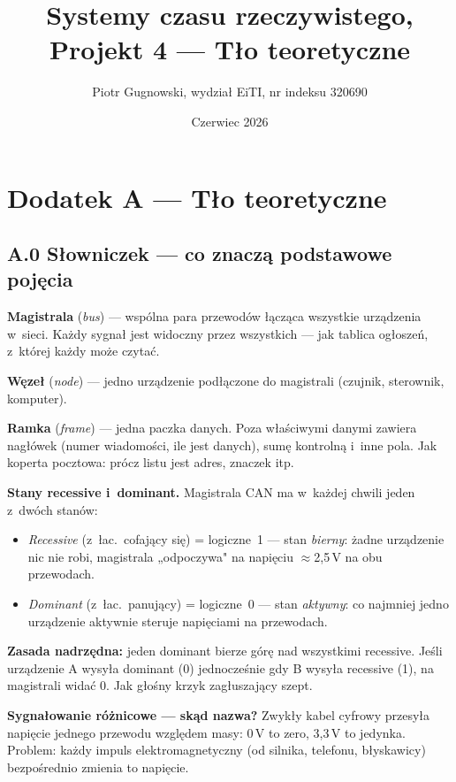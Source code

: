 \documentclass[12pt,a4paper]{article}
\title{Systemy czasu rzeczywistego, Projekt 4 — Tło teoretyczne}
\author{Piotr Gugnowski, wydział EiTI, nr indeksu 320690}
\date{Czerwiec 2026}
\begin{document}
\maketitle

\section*{Dodatek A — Tło teoretyczne}

\subsection*{A.0 Słowniczek — co znaczą podstawowe pojęcia}

\textbf{Magistrala} (\textit{bus}) — wspólna para przewodów łącząca wszystkie
urządzenia w~sieci. Każdy sygnał jest widoczny przez wszystkich — jak tablica
ogłoszeń, z~której każdy może czytać.

\medskip
\textbf{Węzeł} (\textit{node}) — jedno urządzenie podłączone do magistrali
(czujnik, sterownik, komputer).

\medskip
\textbf{Ramka} (\textit{frame}) — jedna paczka danych. Poza właściwymi danymi
zawiera nagłówek (numer wiadomości, ile jest danych), sumę kontrolną i~inne pola.
Jak koperta pocztowa: prócz listu jest adres, znaczek itp.

\medskip
\textbf{Stany recessive i~dominant.}
Magistrala CAN ma w~każdej chwili jeden z~dwóch stanów:
\begin{itemize}
    \item \textit{Recessive} (z~łac.\ cofający się) = logiczne~1 — stan
          \emph{bierny}: żadne urządzenie nic nie robi, magistrala
          „odpoczywa" na napięciu $\approx$2,5\,V na obu przewodach.
    \item \textit{Dominant} (z~łac.\ panujący) = logiczne~0 — stan
          \emph{aktywny}: co najmniej jedno urządzenie aktywnie steruje
          napięciami na przewodach.
\end{itemize}
\textbf{Zasada nadrzędna:} jeden dominant bierze górę nad wszystkimi
recessive. Jeśli urządzenie A wysyła dominant (0) jednocześnie gdy B wysyła
recessive (1), na magistrali widać 0. Jak głośny krzyk zagłuszający szept.

\medskip
\textbf{Sygnałowanie różnicowe — skąd nazwa?}
Zwykły kabel cyfrowy przesyła napięcie jednego przewodu względem masy:
0\,V to zero, 3,3\,V to jedynka. Problem: każdy impuls elektromagnetyczny
(od silnika, telefonu, błyskawicy) bezpośrednio zmienia to napięcie.
\end{document}
